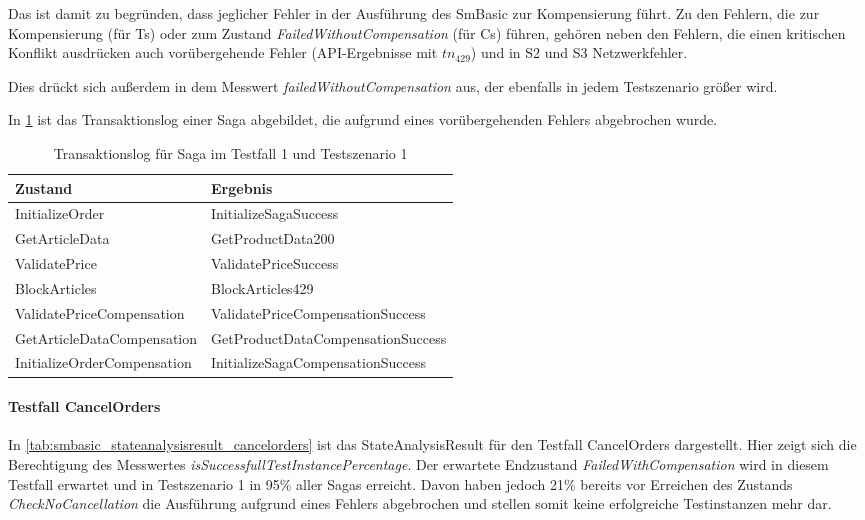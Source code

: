 Das ist damit zu begründen, dass jeglicher Fehler in der Ausführung des SmBasic zur Kompensierung führt. Zu den Fehlern, die zur Kompensierung (für Ts) oder zum Zustand \textit{FailedWithoutCompensation} (für Cs) führen, gehören neben den Fehlern, die einen kritischen Konflikt ausdrücken auch vorübergehende Fehler (API-Ergebnisse mit $tn_{429}$) und in S2 und S3 Netzwerkfehler. 

Dies drückt sich außerdem in dem Messwert \textit{failedWithoutCompensation} aus, der ebenfalls in jedem Testszenario größer wird.

In \cref{tab:transaktionslog_ts1_tc1_429} ist das Transaktionslog einer Saga abgebildet, die aufgrund eines vorübergehenden Fehlers abgebrochen wurde. 

\begin{center}
	\fontsize{9}{12}\selectfont
	\begin{longtable}[h]{|p{4.5cm}|p{7cm}|}
		\hline
		Zustand & Ergebnis \\* \hline
		\endhead
		\hline
		\caption{Transaktionslog für Saga im Testfall 1 und Testszenario 1}
		\label{tab:transaktionslog_ts1_tc1_429}
		\endfoot
  		InitializeOrder & InitializeSagaSuccess \\* \hline
		GetArticleData & GetProductData200 \\* \hline
		ValidatePrice & ValidatePriceSuccess \\* \hline
		\rowcolor{Gray}
		BlockArticles & BlockArticles429 \\* \hline
		ValidatePriceCompensation & ValidatePriceCompensationSuccess \\* \hline
		GetArticleDataCompensation & GetProductDataCompensationSuccess \\* \hline
		InitializeOrderCompensation & InitializeSagaCompensationSuccess \\* \hline
	\end{longtable}
\end{center}
\FloatBarrier

\paragraph*{Testfall CancelOrders}
In \cref{tab:smbasic_stateanalysisresult_cancelorders} ist das StateAnalysisResult für den Testfall CancelOrders dargestellt. Hier zeigt sich die Berechtigung des Messwertes \textit{isSuccessfullTestInstancePercentage}. Der erwartete Endzustand \textit{FailedWithCompensation} wird in diesem Testfall erwartet und in Testszenario 1 in 95\% aller Sagas erreicht. Davon haben jedoch 21\% bereits vor Erreichen des Zustands \textit{CheckNoCancellation} die Ausführung aufgrund eines Fehlers abgebrochen und stellen somit keine erfolgreiche Testinstanzen mehr dar.

